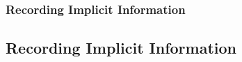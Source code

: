 \begin{figure}[h!]

\ifnotpaper\subsubsection{Recording Implicit Information}
\else\subsection{Recording Implicit Information}
\fi\label{imp-info}


\end{figure}
